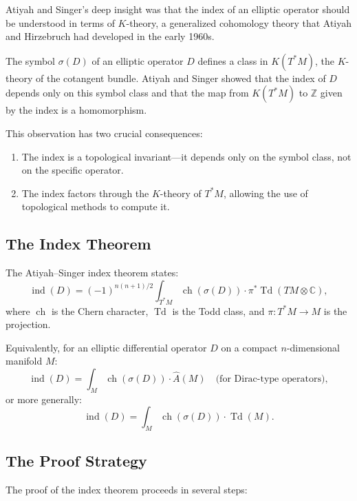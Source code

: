 Atiyah and Singer's deep insight was that the index of an elliptic operator should be understood in terms of $K$-theory, a generalized cohomology theory that Atiyah and Hirzebruch had developed in the early 1960s.

The symbol $\sigma(D)$ of an elliptic operator $D$ defines a class in $K(T^*M)$, the $K$-theory of the cotangent bundle. Atiyah and Singer showed that the index of $D$ depends only on this symbol class and that the map from $K(T^*M)$ to $\mathbb{Z}$ given by the index is a homomorphism.

This observation has two crucial consequences:
\begin{enumerate}
\item The index is a topological invariant---it depends only on the symbol class, not on the specific operator.
\item The index factors through the $K$-theory of $T^*M$, allowing the use of topological methods to compute it.
\end{enumerate}

\subsection{The Index Theorem}

The Atiyah--Singer index theorem states:
\[
\operatorname{ind}(D) = (-1)^{n(n+1)/2} \int_{T^*M} \operatorname{ch}(\sigma(D)) \cdot \pi^* \operatorname{Td}(TM \otimes \mathbb{C}),
\]
where $\operatorname{ch}$ is the Chern character, $\operatorname{Td}$ is the Todd class, and $\pi: T^*M \to M$ is the projection.

Equivalently, for an elliptic differential operator $D$ on a compact $n$-dimensional manifold $M$:
\[
\operatorname{ind}(D) = \int_M \operatorname{ch}(\sigma(D)) \cdot \widehat A(M) \quad \text{(for Dirac-type operators)},
\]
or more generally:
\[
\operatorname{ind}(D) = \int_M \operatorname{ch}(\sigma(D)) \cdot \operatorname{Td}(M).
\]

\subsection{The Proof Strategy}

The proof of the index theorem proceeds in several steps:

